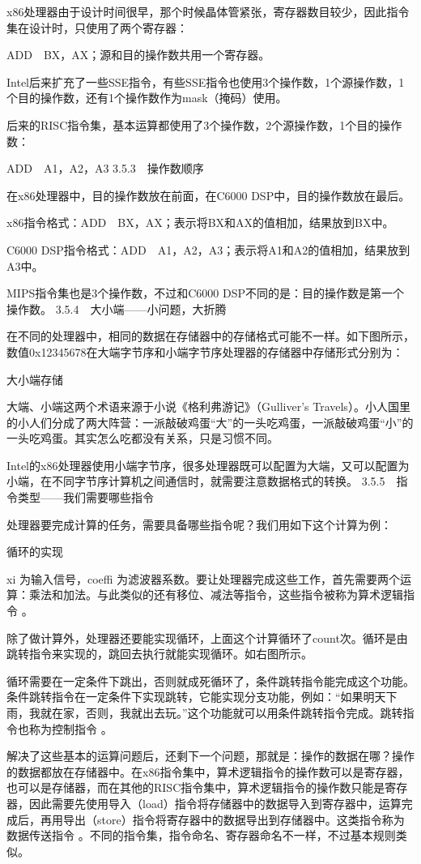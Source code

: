 \documentclass[12pt,UTF8]{ctexbook}
\begin{document}
x86处理器由于设计时间很早，那个时候晶体管紧张，寄存器数目较少，因此指令集在设计时，只使用了两个寄存器：

ADD　BX，AX；源和目的操作数共用一个寄存器。

Intel后来扩充了一些SSE指令，有些SSE指令也使用3个操作数，1个源操作数，1个目的操作数，还有1个操作数作为mask（掩码）使用。

后来的RISC指令集，基本运算都使用了3个操作数，2个源操作数，1个目的操作数：

ADD　A1，A2，A3
3.5.3　操作数顺序

在x86处理器中，目的操作数放在前面，在C6000 DSP中，目的操作数放在最后。

x86指令格式：ADD　BX，AX；表示将BX和AX的值相加，结果放到BX中。

C6000 DSP指令格式：ADD　A1，A2，A3；表示将A1和A2的值相加，结果放到A3中。

MIPS指令集也是3个操作数，不过和C6000 DSP不同的是：目的操作数是第一个操作数。
3.5.4　大小端——小问题，大折腾

在不同的处理器中，相同的数据在存储器中的存储格式可能不一样。如下图所示，数值0x12345678在大端字节序和小端字节序处理器的存储器中存储形式分别为：

大小端存储

大端、小端这两个术语来源于小说《格利弗游记》（Gulliver's Travels）。小人国里的小人们分成了两大阵营：一派敲破鸡蛋“大”的一头吃鸡蛋，一派敲破鸡蛋“小”的一头吃鸡蛋。其实怎么吃都没有关系，只是习惯不同。

Intel的x86处理器使用小端字节序，很多处理器既可以配置为大端，又可以配置为小端，在不同字节序计算机之间通信时，就需要注意数据格式的转换。
3.5.5　指令类型——我们需要哪些指令

处理器要完成计算的任务，需要具备哪些指令呢？我们用如下这个计算为例：

循环的实现

xi 为输入信号，coeffi 为滤波器系数。要让处理器完成这些工作，首先需要两个运算：乘法和加法。与此类似的还有移位、减法等指令，这些指令被称为算术逻辑指令 。

除了做计算外，处理器还要能实现循环，上面这个计算循环了count次。循环是由跳转指令来实现的，跳回去执行就能实现循环。如右图所示。

循环需要在一定条件下跳出，否则就成死循环了，条件跳转指令能完成这个功能。条件跳转指令在一定条件下实现跳转，它能实现分支功能，例如：“如果明天下雨，我就在家，否则，我就出去玩。”这个功能就可以用条件跳转指令完成。跳转指令也称为控制指令 。

解决了这些基本的运算问题后，还剩下一个问题，那就是：操作的数据在哪？操作的数据都放在存储器中。在x86指令集中，算术逻辑指令的操作数可以是寄存器，也可以是存储器，而在其他的RISC指令集中，算术逻辑指令的操作数只能是寄存器，因此需要先使用导入（load）指令将存储器中的数据导入到寄存器中，运算完成后，再用导出（store）指令将寄存器中的数据导出到存储器中。这类指令称为数据传送指令 。不同的指令集，指令命名、寄存器命名不一样，不过基本规则类似。
\end{document}
